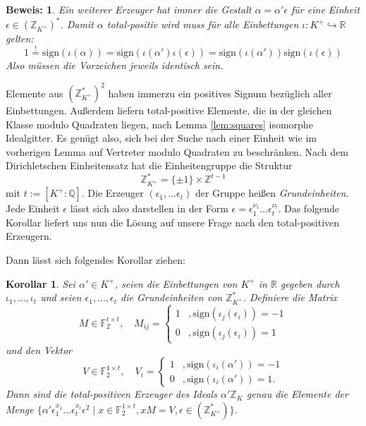 \documentclass[12pt,a4paper,halfparskip,headsepline,bibtotocnumbered]{scrreprt}
\theoremstyle{nummermitklammern}
\newtheorem{korollar}[defsatzusw]{Korollar}
\theoremstyle{nonumberbreak}
\newtheorem{beweis}{Beweis:}
\newcommand{\Z}{\mathbb{Z}}
\newcommand{\Q}{\mathbb{Q}}
\newcommand{\R}{\mathbb{R}}
\newcommand{\F}{\mathbb{F}}
\begin{document}
\begin{beweis}
	Ein weiterer Erzeuger hat immer die Gestalt $\alpha = \alpha' \epsilon$ für eine Einheit $\epsilon \in (\Z_{K^+})^\ast$. Damit $\alpha$ total-positiv wird muss für alle Einbettungen $\iota : K^+ \hookrightarrow \R$ gelten:
	\begin{equation*}
		1 \stackrel{!}{=} \text{sign}\left( \iota(\alpha) \right) = \text{sign}\left( \iota(\alpha') \iota(\epsilon) \right) = \text{sign}\left( \iota(\alpha') \right) \text{sign}\left( \iota(\epsilon) \right)
	\end{equation*}
	Also müssen die Vorzeichen jeweils identisch sein.
\end{beweis}

Elemente aus $\left(\Z_{K^+}^\ast\right)^2$ haben immerzu ein positives Signum bezüglich aller Einbettungen. Außerdem liefern total-positive Elemente, die in der gleichen Klasse modulo Quadraten liegen, nach Lemma \eqref{lem:squares} isomorphe Idealgitter. Es genügt also, sich bei der Suche nach einer Einheit wie im vorherigen Lemma auf Vertreter modulo Quadraten zu beschränken. Nach dem Dirichletschen Einheitensatz \cite[Theorem (7.4)]{neukirch} hat die Einheitengruppe die Struktur
\begin{equation*}
	\Z_{K^+}^\ast = \lbrace \pm 1 \rbrace \times \Z^{t-1}
\end{equation*}
mit $t := \left[K^+ : \Q \right]$. Die Erzeuger $(\epsilon_1, \dots \epsilon_t)$ der Gruppe heißen  \textit{Grundeinheiten}. Jede Einheit $\epsilon$ lässt sich also darstellen in der Form $\epsilon = \epsilon_1^{\nu_1} \dots \epsilon_t^{\nu_t}$. Das folgende Korollar liefert uns nun die Lösung auf unsere Frage nach den total-positiven Erzeugern.


Dann lässt sich folgendes Korollar ziehen:

\begin{framed}
	\begin{korollar}
		Sei $\alpha' \in K^+$, seien die Einbettungen von $K^+$ in $\R$ gegeben durch $\iota_1, \dots, \iota_{t}$ und seien $\epsilon_1, \dots, \epsilon_t$ die Grundeinheiten von $\Z_{K^+}^\ast$. 				Definiere die Matrix
		\begin{equation*}
			M \in \F_2^{t \times t}, \quad M_{ij} = \begin{cases} 1 &, \text{sign}(\iota_j(\epsilon_i)) = -1\\ 0 &, \text{sign}(\iota_j(\epsilon_i)) = 1\end{cases}
		\end{equation*}
		und den Vektor
		\begin{equation*}
			V \in \F_2^{1 \times t}, \quad V_i = \begin{cases} 1 &, \text{sign}(\iota_i(\alpha')) = -1\\ 0 &, \text{sign}(\iota_i(\alpha')) = 1.\end{cases}
		\end{equation*}
		Dann sind die total-positiven Erzeuger des Ideals $\alpha' \Z_K$ genau die Elemente der Menge $\lbrace \alpha' \epsilon_1^{x_1} \dots \epsilon_t^{x_t} \epsilon^2 \mid x \in \F_2^{1 \times t}, x M = V, \epsilon \in (\Z_{K^+}^\ast) \rbrace$.
	\end{korollar}
\end{framed}
\end{document}
